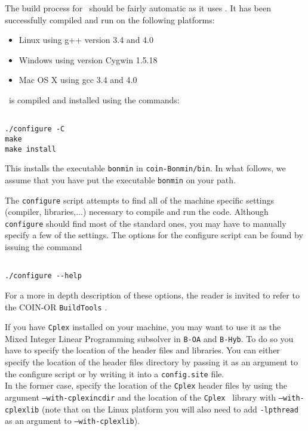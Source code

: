 The build process for \Bonmin\ should be fairly automatic as it uses
.
  It has been successfully compiled and run on the following platforms:
\begin{itemize}
\item Linux using g++ version 3.4 and 4.0
\item Windows using version Cygwin 1.5.18
\item Mac OS X using gcc 3.4 and 4.0
\end{itemize}
\Bonmin\ is compiled and installed using the commands:
\begin{verbatim}

./configure -C
make
make install

\end{verbatim}

This installs the executable {\tt bonmin} in {\tt coin-Bonmin/bin}. In what follows, we assume
that you have put the executable {\tt bonmin} on your path.

The {\tt configure} script attempts to find all of the machine specific settings (compiler, libraries,...)
necessary to compile and run the code. Although {\tt configure} should find most of the standard
ones, you may have to manually specify a few of the settings.
The options for the configure script can be found by issuing the command
\begin{verbatim}

./configure --help

\end{verbatim}
For a more in depth description of these options,
the reader is invited to refer to the COIN-OR {\tt BuildTools} .

If you have {\tt Cplex} installed on your machine, you may want to use it
as the Mixed Integer Linear Programming subsolver in {\tt B-OA} and {\tt B-Hyb}.
To do so you have to specify the location of the header files and libraries.
You can either specify the location of the header files directory by passing it as an
argument to the configure script or by writing it into a {\tt config.site} file.\\

In the former case, specify the location of the {\tt Cplex} header files by using the
argument {\tt --with-cplexincdir} and the location of the
{\tt Cplex } library with {\tt --with-cplexlib} (note that on the Linux platform you will also
need to add {\tt -lpthread} as an argument to {\tt --with-cplexlib}).\\

